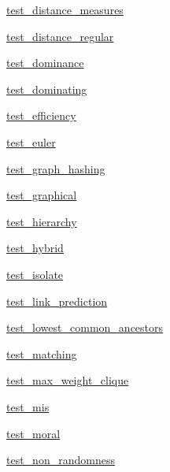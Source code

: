 \begin{DoxyCompactItemize}
 \hyperlink{namespacenetworkx_1_1algorithms_1_1tests_1_1test__distance__measures}{test\+\_\+distance\+\_\+measures}
\item 
 \hyperlink{namespacenetworkx_1_1algorithms_1_1tests_1_1test__distance__regular}{test\+\_\+distance\+\_\+regular}
\item 
 \hyperlink{namespacenetworkx_1_1algorithms_1_1tests_1_1test__dominance}{test\+\_\+dominance}
\item 
 \hyperlink{namespacenetworkx_1_1algorithms_1_1tests_1_1test__dominating}{test\+\_\+dominating}
\item 
 \hyperlink{namespacenetworkx_1_1algorithms_1_1tests_1_1test__efficiency}{test\+\_\+efficiency}
\item 
 \hyperlink{namespacenetworkx_1_1algorithms_1_1tests_1_1test__euler}{test\+\_\+euler}
\item 
 \hyperlink{namespacenetworkx_1_1algorithms_1_1tests_1_1test__graph__hashing}{test\+\_\+graph\+\_\+hashing}
\item 
 \hyperlink{namespacenetworkx_1_1algorithms_1_1tests_1_1test__graphical}{test\+\_\+graphical}
\item 
 \hyperlink{namespacenetworkx_1_1algorithms_1_1tests_1_1test__hierarchy}{test\+\_\+hierarchy}
\item 
 \hyperlink{namespacenetworkx_1_1algorithms_1_1tests_1_1test__hybrid}{test\+\_\+hybrid}
\item 
 \hyperlink{namespacenetworkx_1_1algorithms_1_1tests_1_1test__isolate}{test\+\_\+isolate}
\item 
 \hyperlink{namespacenetworkx_1_1algorithms_1_1tests_1_1test__link__prediction}{test\+\_\+link\+\_\+prediction}
\item 
 \hyperlink{namespacenetworkx_1_1algorithms_1_1tests_1_1test__lowest__common__ancestors}{test\+\_\+lowest\+\_\+common\+\_\+ancestors}
\item 
 \hyperlink{namespacenetworkx_1_1algorithms_1_1tests_1_1test__matching}{test\+\_\+matching}
\item 
 \hyperlink{namespacenetworkx_1_1algorithms_1_1tests_1_1test__max__weight__clique}{test\+\_\+max\+\_\+weight\+\_\+clique}
\item 
 \hyperlink{namespacenetworkx_1_1algorithms_1_1tests_1_1test__mis}{test\+\_\+mis}
\item 
 \hyperlink{namespacenetworkx_1_1algorithms_1_1tests_1_1test__moral}{test\+\_\+moral}
\item 
 \hyperlink{namespacenetworkx_1_1algorithms_1_1tests_1_1test__non__randomness}{test\+\_\+non\+\_\+randomness}

\end{DoxyCompactItemize}
